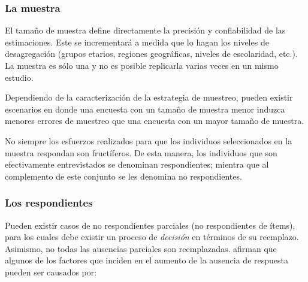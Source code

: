 \documentclass[
  10pt,
  spanish,
]{book}
\begin{document}
\hypertarget{la-muestra}{%
\subsubsection*{La muestra}\label{la-muestra}}

El tamaño de muestra define directamente la precisión y confiabilidad de las estimaciones. Este se incrementará a medida que lo hagan los niveles de desagregación (grupos etarios, regiones geográficas, niveles de escolaridad, etc.). La muestra es sólo una y no es posible replicarla varias veces en un mismo estudio.

Dependiendo de la caracterización de la estrategia de muestreo, pueden existir escenarios en donde una encuesta con un tamaño de muestra menor induzca menores errores de muestreo que una encuesta con un mayor tamaño de muestra.

No siempre los esfuerzos realizados para que los individuos seleccionados en la muestra respondan son fructíferos. De esta manera, los individuos que son efectivamente entrevistados se denominan respondientes; mientra que al complemento de este conjunto se les denomina no respondientes.

\hypertarget{los-respondientes}{%
\subsubsection*{Los respondientes}\label{los-respondientes}}

Pueden existir casos de no respondientes parciales (no respondientes de ítems), para los cuales debe existir un proceso de \emph{decisión} en términos de su reemplazo. Asimismo, no todas las ausencias parciales son reemplazadas. \citet{Groves_Fowler_Couper_Lepkowski_Singer_Tourangeau_2009} afirman que algunos de los factores que inciden en el aumento de la ausencia de respuesta pueden ser causados por:
\end{document}
